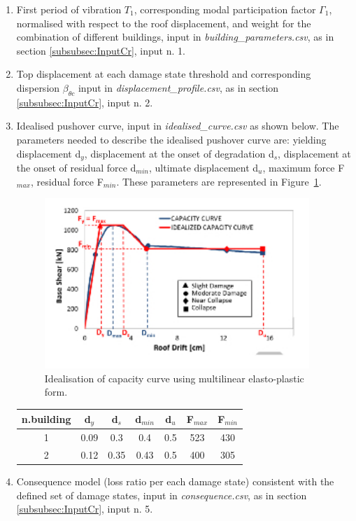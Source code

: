 \begin{enumerate}
\item First period of vibration $T_1$, corresponding modal participation factor $\Gamma_1$, normalised with respect to the roof displacement, and weight for the combination of different buildings, input in \textit{building\_parameters.csv}, as in section \ref{subsubsec:InputCr}, input n. 1.
	
\item Top displacement at each damage state threshold and corresponding dispersion $\beta_{\theta c}$ input in \textit{displacement\_profile.csv}, as in section \ref{subsubsec:InputCr}, input n. 2. 
	
\item Idealised pushover curve, input in \textit{idealised\_curve.csv} as shown below. The parameters needed to describe the idealised pushover curve are: yielding displacement d$_y$, displacement at the onset of degradation d$_s$, displacement at the onset of residual force d$_{min}$, ultimate displacement d$_u$, maximum force F$_{max}$, residual force F$_{min}$. These parameters are represented in Figure~\ref{fig:quadrilinear}.

\begin{figure}[!htbp]
\centering
\includegraphics[width=10cm]{./figures/quadrilinear.jpg}
\caption{Idealisation of capacity curve using multilinear elasto-plastic form.}
\label{fig:quadrilinear}
\end{figure}

\begin{table}[!htbp]
\centering
\begin{tabular}{|c|c|c|c|c|c|c|} \hline
\textbf{n.building} & \textbf{d$_y$} & \textbf{d$_s$} & \textbf{d$_{min}$} & \textbf{d$_u$} & \textbf{F$_{max}$} & \textbf{F$_{min}$} \\ \hline
1 & 0.09	& 0.3	& 0.4 & 0.5 & 523 & 430\\ \hline
2 & 0.12	& 0.35	 & 0.43 & 0.5 & 400 & 305\\ \hline	
\end{tabular}
\end{table}

\item Consequence model (loss ratio per each damage state) consistent with the defined set of damage states, input in \textit{consequence.csv}, as in section \ref{subsubsec:InputCr}, input n. 5.
	
\end{enumerate}

